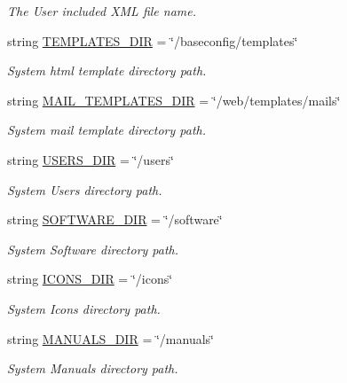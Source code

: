 \begin{CompactItemize}
\begin{CompactList}\small\item\em The User included XML file name. \item\end{CompactList}\item 
string \hyperlink{namespaceweb__winsol_d6dd82765ddcc490f6ca47aaf25bb634}{TEMPLATES\_\-DIR} = \char`\"{}/baseconfig/templates\char`\"{}
\begin{CompactList}\small\item\em System html template directory path. \item\end{CompactList}\item 
string \hyperlink{namespaceweb__winsol_f1688133afaa1ae7f229f772e63d8eb2}{MAIL\_\-TEMPLATES\_\-DIR} = \char`\"{}/web/templates/mails\char`\"{}
\begin{CompactList}\small\item\em System mail template directory path. \item\end{CompactList}\item 
string \hyperlink{namespaceweb__winsol_67de5db9c4a2362e0eb7b76b42d7630c}{USERS\_\-DIR} = \char`\"{}/users\char`\"{}
\begin{CompactList}\small\item\em System Users directory path. \item\end{CompactList}\item 
string \hyperlink{namespaceweb__winsol_e7552d7a2db57cdafa18403c7feb12b7}{SOFTWARE\_\-DIR} = \char`\"{}/software\char`\"{}
\begin{CompactList}\small\item\em System Software directory path. \item\end{CompactList}\item 
string \hyperlink{namespaceweb__winsol_f59bb54f7c61a1aed497363d9c6b1876}{ICONS\_\-DIR} = \char`\"{}/icons\char`\"{}
\begin{CompactList}\small\item\em System Icons directory path. \item\end{CompactList}\item 
string \hyperlink{namespaceweb__winsol_0c2448b521ee3e0d5fb865773d1e9d52}{MANUALS\_\-DIR} = \char`\"{}/manuals\char`\"{}
\begin{CompactList}\small\item\em System Manuals directory path. \item\end{CompactList}\item 

\end{CompactItemize}
